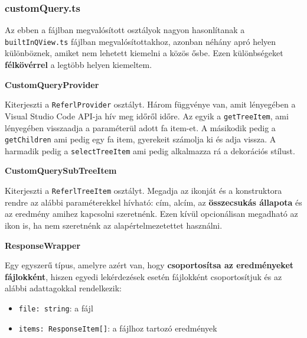 \subsubsection{customQuery.ts}

Az ebben a fájlban megvalósított osztályok nagyon hasonlítanak a \lstinline{builtInQView.ts} fájlban megvalósítottakhoz, azonban néhány apró helyen különböznek, amiket nem lehetett kiemelni a közös ősbe. Ezen különbségeket \textbf{félkövérrel} a legtöbb helyen kiemeltem.



\vspace{14pt}
\noindent \textbf{CustomQueryProvider}


\noindent Kiterjeszti a \lstinline{ReferlProvider} osztályt. Három függvénye van, amit lényegében a Visual Studio Code API-ja hív meg időről időre. Az egyik a \lstinline{getTreeItem}, ami lényegében visszaadja a paraméterül adott fa item-et. A másikodik pedig a \lstinline{getChildren} ami pedig egy fa item, gyerekeit számolja ki és adja vissza. A harmadik pedig a \lstinline{selectTreeItem} ami pedig alkalmazza rá a dekorációs stílust.






\vspace{14pt}
\noindent \textbf{CustomQuerySubTreeItem}


\noindent Kiterjeszti a \lstinline{ReferlTreeItem} osztályt. Megadja az ikonját és a konstruktora rendre az alábbi paraméterekkel hívható: cím, alcím, az \textbf{összecsukás állapota} és az eredmény amihez kapcsolni szeretnénk. Ezen kívül opcionálisan megadható az ikon is, ha nem szeretnénk az alapértelmezetettet használni.



\newpage


\vspace{14pt}
\noindent \textbf{ResponseWrapper}


\noindent Egy egyszerű típus, amelyre azért van, hogy \textbf{csoportosítsa az eredményeket fájlokként}, hiszen egyedi lekérdezések esetén fájlokként csoportosítjuk és az alábbi adattagokkal rendelkezik:

\begin{itemize}
    \item \lstinline{file: string}: a fájl
    
    \item \lstinline{items: ResponseItem[]}: a fájlhoz tartozó eredmények

\end{itemize}







